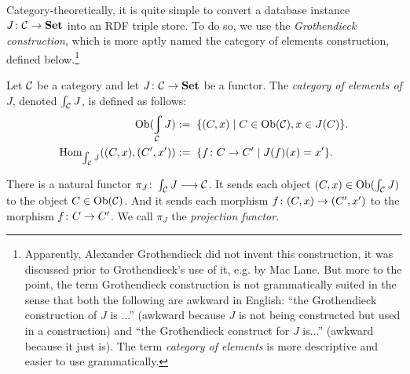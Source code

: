 \documentclass[CT4S-EN-RU]{subfiles}
\begin{document}
\begin{blockRUS}
\end{blockRUS}

\begin{blockENG}
Category-theoretically, it is quite simple to convert a database instance $J\colon\mathcal{C}\rightarrow{\mathbf{Set}}$ into an RDF triple store. To do so, we use the {\em Grothendieck construction}, which is more aptly named the category of elements construction, defined below.\footnote{Apparently, Alexander Grothendieck did not invent this construction, it was discussed prior to Grothendieck's use of it, e.g. by Mac Lane. But more to the point, the term Grothendieck construction is not grammatically suited in the sense that both the following are awkward in English: “the Grothendieck construction of $J$ is ...” (awkward because $J$ is not being constructed but used in a construction) and “the Grothendieck construct for $J$ is...” (awkward because it just is). The term {\em category of elements} is more descriptive and easier to use grammatically.}
\end{blockENG}

\begin{blockRUS}
\end{blockRUS}

\begin{definitionENG}\label{def:grothendieck}
Let $\mathcal{C}$ be a category and let $J\colon\mathcal{C}\rightarrow{\mathbf{Set}}$ be a functor. The {\em category of elements of $J$}, denoted $\int_\mathcal{C} J$, is defined as follows:
\begin{align*}
\Ob(\varint_\mcC J):=&\;\;\{(C,x)\|C\in\Ob(\mcC), x\in J(C)\}.\\
\Hom_{\int_\mcC J}((C,x),(C',x')):=&\;\;\{f\taking C\to C'\|J(f)(x)=x'\}.
\end{align*}

There is a natural functor $\pi_J\colon\int_\mathcal{C} J\longrightarrow\mathcal{C}$. It sends each object $(C,x)\in\textnormal{Ob}(\int_\mathcal{C} J)$ to the object $C\in\textnormal{Ob}(\mathcal{C})$. And it sends each morphism $f\colon (C,x)\rightarrow (C',x')$ to the morphism $f\colon C\rightarrow C'$. We call $\pi_J$ the {\em projection functor}.
\end{definitionENG}

\begin{definitionRUS}\label{def:grothendieck}
\end{definitionRUS}
\end{document}
